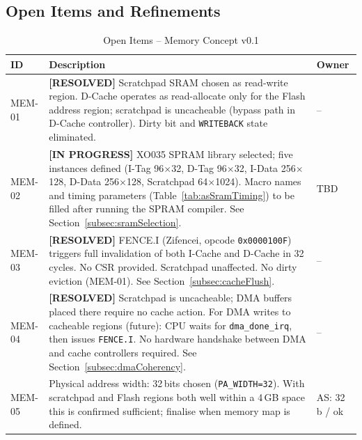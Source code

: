 \subsection{Open Items and Refinements}

\begin{table}[H]
\caption{Open Items -- Memory Concept v0.1}
\label{tab:asMemOpenItems}
\centering
\begin{tabularx}{\textwidth}{|l |X |l|}
  \hline
  ID & Description & Owner \\
  \hline
  \hline
  MEM-01 & \textbf{[RESOLVED]} Scratchpad SRAM chosen as read-write region.
           D-Cache operates as read-allocate only for the Flash address region;
           scratchpad is uncacheable (bypass path in D-Cache controller).
           Dirty bit and \texttt{WRITEBACK} state eliminated. & -- \\
  \hline
  MEM-02 & \textbf{[IN PROGRESS]} XO035 SPRAM library selected; five instances
           defined (I-Tag 96$\times$32, D-Tag 96$\times$32, I-Data 256$\times$128,
           D-Data 256$\times$128, Scratchpad 64$\times$1024).
           Macro names and timing parameters (Table~\ref{tab:asSramTiming})
           to be filled after running the SPRAM compiler.
           See Section~\ref{subsec:sramSelection}. & TBD \\
  \hline
  MEM-03 & \textbf{[RESOLVED]} FENCE.I (Zifencei, opcode \texttt{0x0000100F})
           triggers full invalidation of both I-Cache and D-Cache in 32 cycles.
           No CSR provided. Scratchpad unaffected. No dirty eviction (MEM-01).
           See Section~\ref{subsec:cacheFlush}. & -- \\
  \hline
  MEM-04 & \textbf{[RESOLVED]} Scratchpad is uncacheable; DMA buffers placed
           there require no cache action.
           For DMA writes to cacheable regions (future): CPU waits for
           \texttt{dma\_done\_irq}, then issues \texttt{FENCE.I}.
           No hardware handshake between DMA and cache controllers required.
           See Section~\ref{subsec:dmaCoherency}. & -- \\
  \hline
  MEM-05 & Physical address width: 32\,bits chosen (\texttt{PA\_WIDTH=32}).
           With scratchpad and Flash regions both well within a 4\,GB space
           this is confirmed sufficient; finalise when memory map is defined. & AS: 32\,b / ok \\

\end{tabularx}
\end{table}
